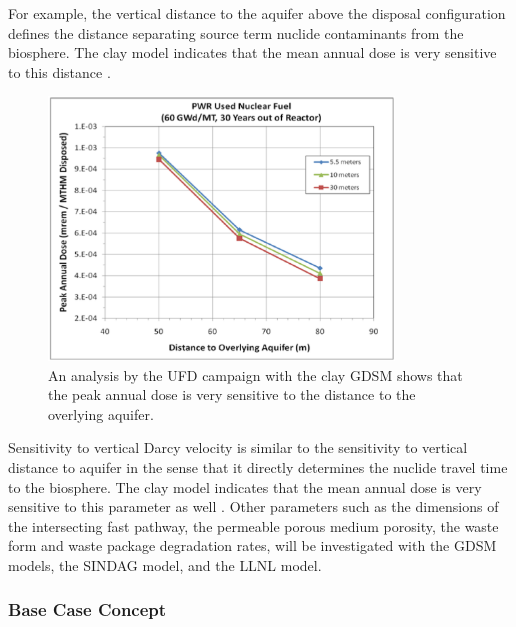 For example, the vertical distance to the aquifer above the disposal configuration
defines the distance separating source term nuclide contaminants from the biosphere. 
The clay model indicates that the mean annual dose is very sensitive to this 
distance \cite{clayton_generic_2011}.

\begin{figure}[h!]
  \begin{center}
    \includegraphics[height=7cm]{./chapters/future/overlyingDist.eps}
  \end{center}
  \caption[Distance to Aquifer Peak Dose Sensitivity]{An analysis by the UFD campaign with the clay GDSM shows that 
  the peak annual dose is very sensitive to the distance to the overlying 
  aquifer\cite{clayton_generic_2011}.}
  \label{fig:overlyingDist}
\end{figure}
\clearpage

Sensitivity to vertical Darcy velocity is similar to the sensitivity to vertical 
distance to aquifer in the sense that it directly determines the nuclide travel 
time to the biosphere. The clay model indicates that the mean annual dose is 
very sensitive to this parameter as well \cite{clayton_generic_2011}. Other 
parameters such as the dimensions of the intersecting fast pathway, the 
permeable porous medium porosity, the waste form and waste package degradation 
rates, will be investigated with the \gls{GDSM} models, the \gls{SINDAG} model, 
and the \gls{LLNL} model. 

\subsubsection{Base Case Concept}



